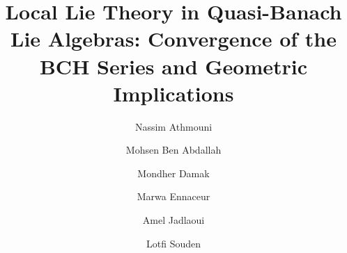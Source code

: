 \documentclass[10pt]{amsart}
\theoremstyle{definition}
\theoremstyle{remark}
\numberwithin{equation}{section}
\begin{document}
\title[Local Lie Theory in Quasi-Banach Algebras]{Local Lie Theory in Quasi-Banach Lie Algebras: Convergence of the BCH Series and Geometric Implications}

\author[N. Athmouni]{Nassim Athmouni}
\address{N.~Athmouni: Universit\'e de Gafsa, Campus Universitaire, 2112 Gafsa, Tunisia}

\author[M. Ben Abdallah]{Mohsen Ben Abdallah}
\address{M.~Ben Abdallah: Universit\'e de Sfax, Route de la Soukra km 4, B.P. 802, 3038 Sfax, Tunisia}

\author[M. Damak]{Mondher Damak}
\address{M.~Damak: Universit\'e de Sfax, Route de la Soukra km 4, B.P. 802, 3038 Sfax, Tunisia}

\author[M. Ennaceur]{Marwa Ennaceur}
\address{M.~Ennaceur: Department of Mathematics, College of Science, University of Ha'il, Ha'il 81451, Saudi Arabia}

\author[A. Jadlaoui]{Amel Jadlaoui}
\address{A.~Jadlaoui: Universit\'e de Sfax, Route de la Soukra km 4, B.P. 802, 3038 Sfax, Tunisia}

\author[L. Souden]{Lotfi Souden}
\address{L.~Souden: Universit\'e de Gafsa, Campus Universitaire, 2112 Gafsa, Tunisia}

\end{document}

